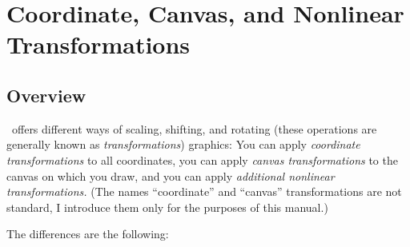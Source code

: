 %
%
%

\section{Coordinate, Canvas, and Nonlinear Transformations}

\subsection{Overview}

\pgfname\ offers different ways of scaling, shifting, and rotating
(these operations are generally known as \emph{transformations})
graphics: You can apply \emph{coordinate transformations} to all
coordinates, you can apply \emph{canvas transformations} to the
canvas on which you draw, and you can apply \emph{additional nonlinear
  transformations.} (The names ``coordinate'' and ``canvas''
transformations are not standard, I introduce them only for the
purposes of this manual.) 

The differences are the following:

